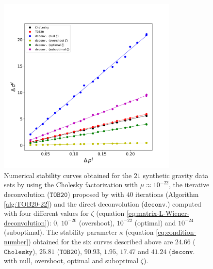 \begin{figure}[htbp]
	\begin{center}
		\includegraphics[width=9cm]{Fig/stability_grav}
	\end{center}
	\caption{
		Numerical stability curves obtained for the $21$ synthetic gravity data sets 
		by using the Cholesky factorization with $\mu \approx 10^{-22}$, the iterative deconvolution
		($\mathtt{TOB20}$) proposed by \citet{takahashi-etal2020} with $40$ iterations (Algorithm \ref{alg:TOB20-22}) 
		and the direct deconvolution ($\mathtt{deconv.}$) computed with four different values for $\zeta$ 
		(equation \ref{eq:matrix-L-Wiener-deconvolution}): $0$, $10^{-20}$ (overshoot), $10^{-22}$ (optimal)
		and $10^{-24}$ (suboptimal).
		The stability parameter $\kappa$ (equation \ref{eq:condition-number}) obtained for the six curves
		described above are $24.66$ ($\mathtt{Cholesky}$), $25.81$ ($\mathtt{TOB20}$), $90.93$, $1.95$, $17.47$ and $41.24$ ($\mathtt{deconv.}$ with null, overshoot, optimal and suboptimal $\zeta$).
		}
	\label{fig:3}
\end{figure}

